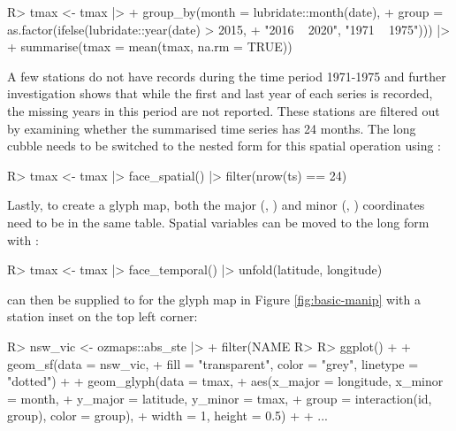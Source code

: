 \documentclass[
]{jss}
\begin{document}
\begin{CodeChunk}
\begin{CodeInput}
R> tmax <- tmax |>
+   group_by(month = lubridate::month(date),
+          group = as.factor(ifelse(lubridate::year(date) > 2015,
+                                   "2016 ~ 2020", "1971 ~ 1975"))) |>
+   summarise(tmax = mean(tmax, na.rm = TRUE))
\end{CodeInput}
\end{CodeChunk}

A few stations do not have records during the time period 1971-1975 and further investigation shows that while the first and last year of each series is recorded, the missing years in this period are not reported. These stations are filtered out by examining whether the summarised time series has 24 months. The long cubble needs to be switched to the nested form for this spatial operation using :

\begin{CodeChunk}
\begin{CodeInput}
R> tmax <- tmax |> face_spatial() |> filter(nrow(ts) == 24)
\end{CodeInput}
\end{CodeChunk}

Lastly, to create a glyph map, both the major (, ) and minor (, ) coordinates need to be in the same table. Spatial variables can be moved to the long form with :

\begin{CodeChunk}
\begin{CodeInput}
R> tmax <- tmax |> face_temporal() |> unfold(latitude, longitude)
\end{CodeInput}
\end{CodeChunk}

 can then be supplied to  for the glyph map in Figure \ref{fig:basic-manip} with a station inset on the top left corner:

\begin{CodeChunk}
\begin{CodeInput}
R> nsw_vic <- ozmaps::abs_ste |>
+   filter(NAME %
R> 
R> ggplot() +
+   geom_sf(data = nsw_vic,
+           fill = "transparent", color = "grey", linetype = "dotted") +
+   geom_glyph(data = tmax,
+              aes(x_major = longitude, x_minor = month,
+                  y_major = latitude, y_minor = tmax,
+                  group = interaction(id, group), color = group),
+              width = 1, height = 0.5) +
+   ...
\end{CodeInput}
\end{CodeChunk}
\end{document}
